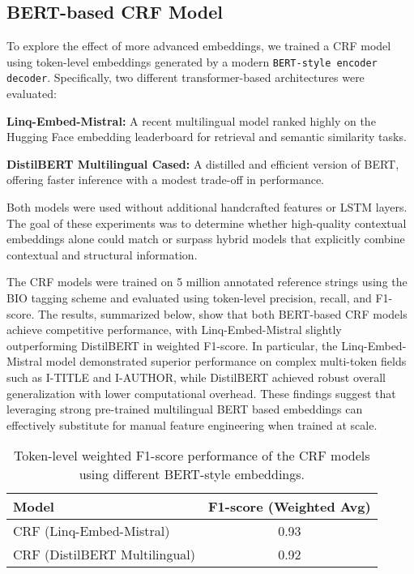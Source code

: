 \subsection{BERT-based CRF Model}
To explore the effect of more advanced embeddings, we trained a CRF model using token-level embeddings generated by a modern \texttt{BERT-style encoder\\decoder}. Specifically, two different transformer-based architectures were evaluated:
\begin{compactitem}
\item \textbf{Linq-Embed-Mistral:} A recent multilingual model ranked highly on the Hugging Face embedding leaderboard for retrieval and semantic similarity tasks.
\item \textbf{DistilBERT Multilingual Cased:} A distilled and efficient version of BERT, offering faster inference with a modest trade-off in performance.
\end{compactitem}

Both models were used without additional handcrafted features or LSTM layers. The goal of these experiments was to determine whether high-quality contextual embeddings alone could match or surpass hybrid models that explicitly combine contextual and structural information.

The CRF models were trained on 5 million annotated reference strings using the BIO tagging scheme and evaluated using token-level precision, recall, and F1-score.
The results, summarized below, show that both BERT-based CRF models achieve competitive performance, with Linq-Embed-Mistral slightly outperforming DistilBERT in weighted F1-score. In particular, the Linq-Embed-Mistral model demonstrated superior performance on complex multi-token fields such as I-TITLE and I-AUTHOR, while DistilBERT achieved robust overall generalization with lower computational overhead. These findings suggest that leveraging strong pre-trained multilingual BERT based embeddings can effectively substitute for manual feature engineering when trained at scale.

\begin{table}[h] 
    \centering 
    \begin{tabular}{|l|c|} 
        \hline 
        \textbf{Model} & \textbf{F1-score (Weighted Avg)} \\ 
        \hline 
        CRF (Linq-Embed-Mistral) & 0.93 \\ CRF (DistilBERT Multilingual) & 0.92 \\ 
        \hline 
    \end{tabular} 
    \caption[BERT-based CRF Token-level Performance]{Token-level weighted F1-score performance of the CRF models using different BERT-style embeddings.} 
    \label{tab:bert_crf_comparison} 
\end{table}


